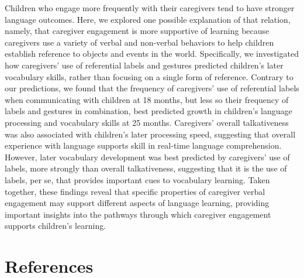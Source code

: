 \documentclass[
  man,mask,floatsintext]{apa6}
\begin{document}
Children who engage more frequently with their caregivers tend to have stronger language outcomes. Here, we explored one possible explanation of that relation, namely, that caregiver engagement is more supportive of learning because caregivers use a variety of verbal and non-verbal behaviors to help children establish reference to objects and events in the world. Specifically, we investigated how caregivers' use of referential labels and gestures predicted children's later vocabulary skills, rather than focusing on a single form of reference. Contrary to our predictions, we found that the frequency of caregivers' use of referential labels when communicating with children at 18 months, but less so their frequency of labels and gestures in combination, best predicted growth in children's language processing and vocabulary skills at 25 months. Caregivers' overall talkativeness was also associated with children's later processing speed, suggesting that overall experience with language supports skill in real-time language comprehension. However, later vocabulary development was best predicted by caregivers' use of labels, more strongly than overall talkativeness, suggesting that it is the use of labels, per se, that provides important cues to vocabulary learning. Taken together, these findings reveal that specific properties of caregiver verbal engagement may support different aspects of language learning, providing important insights into the pathways through which caregiver engagement supports children's learning.

\newpage

\hypertarget{references}{%
\section{References}\label{references}}
\end{document}
